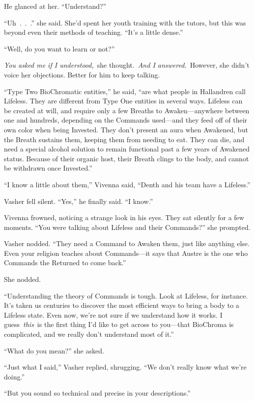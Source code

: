 He glanced at her. “Understand?”

“Uh~.~.~.” she said. She’d spent her youth training with the tutors, but this was beyond even their methods of teaching. “It’s a little dense.”

“Well, do you want to learn or not?”

\textit{You asked me if I understood,}~she thought.~\textit{And I answered.}~However, she didn’t voice her objections. Better for him to keep talking.

“Type Two BioChromatic entities,” he said, “are what people in Hallandren call Lifeless. They are different from Type One entities in several ways. Lifeless can be created at will, and require only a few Breaths to Awaken—anywhere between one and hundreds, depending on the Commands used—and they feed off of their own color when being Invested. They don’t present an aura when Awakened, but the Breath sustains them, keeping them from needing to eat. They can die, and need a special alcohol solution to remain functional past a few years of Awakened status. Because of their organic host, their Breath clings to the body, and cannot be withdrawn once Invested.”

“I know a little about them,” Vivenna said, “Denth and his team have a Lifeless.”

Vasher fell silent. “Yes,” he finally said. “I know.”

Vivenna frowned, noticing a strange look in his eyes. They sat silently for a few moments. “You were talking about Lifeless and their Commands?” she prompted.

Vasher nodded. “They need a Command to Awaken them, just like anything else. Even your religion teaches about Commands—it says that Austre is the one who Commands the Returned to come back.”

She nodded.

“Understanding the theory of Commands is tough. Look at Lifeless, for instance. It’s taken us centuries to discover the most efficient ways to bring a body to a Lifeless state. Even now, we’re not sure if we understand how it works. I guess~\textit{this}~is the first thing I’d like to get across to you—that BioChroma is complicated, and we really don’t understand most of it.”

“What do you mean?” she asked.

“Just what I said,” Vasher replied, shrugging. “We don’t really know what we’re doing.”

“But you sound so technical and precise in your descriptions.”

